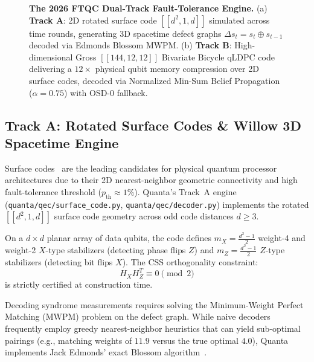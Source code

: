 \documentclass[aps,prx,twocolumn,superscriptaddress,nofootinbib]{revtex4-2}
\begin{document}
\begin{figure}[t]
\centering

\caption{\textbf{The 2026 FTQC Dual-Track Fault-Tolerance Engine.} (a) \textbf{Track A}: 2D rotated surface code $[[d^2, 1, d]]$ simulated across time rounds, generating 3D spacetime defect graphs $\Delta s_t = s_t \oplus s_{t-1}$ decoded via Edmonds Blossom MWPM. (b) \textbf{Track B}: High-dimensional Gross $[[144, 12, 12]]$ Bivariate Bicycle qLDPC code delivering a $12\times$ physical qubit memory compression over 2D surface codes, decoded via Normalized Min-Sum Belief Propagation ($\alpha=0.75$) with OSD-0 fallback.}
\label{fig:dual_track_qec}
\end{figure}

\subsection{Track A: Rotated Surface Codes \& Willow 3D Spacetime Engine}
\label{subsec:track_a_surface}

Surface codes~\cite{fowler2012surface} are the leading candidates for physical quantum processor architectures due to their 2D nearest-neighbor geometric connectivity and high fault-tolerance threshold ($p_{\text{th}} \approx 1\%$). Quanta's Track~A engine (\texttt{quanta/qec/surface_code.py}, \texttt{quanta/qec/decoder.py}) implements the rotated $[[d^2, 1, d]]$ surface code geometry across odd code distances $d \ge 3$.

On a $d \times d$ planar array of data qubits, the code defines $m_X = \frac{d^2 - 1}{2}$ weight-4 and weight-2 $X$-type stabilizers (detecting phase flips $Z$) and $m_Z = \frac{d^2 - 1}{2}$ $Z$-type stabilizers (detecting bit flips $X$). The CSS orthogonality constraint:
\begin{equation}
    H_X H_Z^T \equiv 0 \pmod 2
\end{equation}
is strictly certified at construction time.

Decoding syndrome measurements requires solving the Minimum-Weight Perfect Matching (MWPM) problem on the defect graph. While naive decoders frequently employ greedy nearest-neighbor heuristics that can yield sub-optimal pairings (e.g., matching weights of $11.9$ versus the true optimal $4.0$), Quanta implements Jack Edmonds' exact Blossom algorithm~\cite{edmonds1965paths,kolmogorov2009blossom,higgott2022pymatching,higgott2025sparse}.
\end{document}
